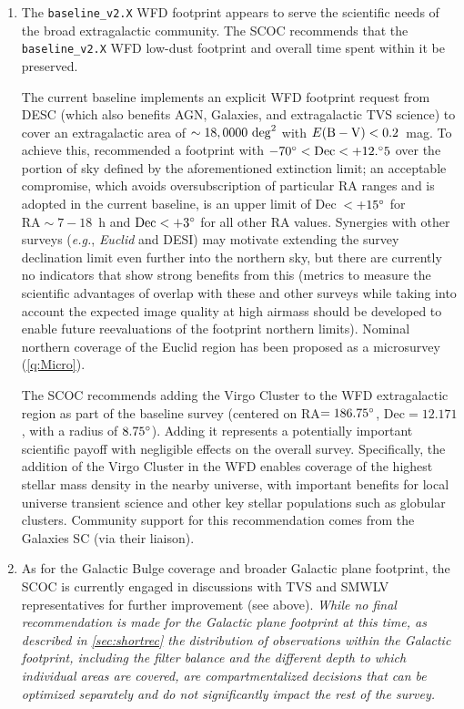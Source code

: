 \begin{enumerate}
\item 
The \texttt{baseline\_v2.X} WFD footprint appears to serve the scientific needs of the broad extragalactic community. The SCOC recommends that the \texttt{baseline\_v2.X} WFD low-dust footprint and overall time spent within it be preserved.

The current baseline implements an explicit WFD footprint request from DESC (which also benefits AGN, Galaxies, and extragalactic TVS science) to cover an extragalactic area of  $\sim18,0000~\mathrm{deg}^2$ with $E(\mathrm{B-V})<0.2$~mag. To achieve this, \cite{2022ApJS..259...58L} recommended a footprint with $-70^{\circ}<\mathrm{Dec}<+12.^{\circ}5$
 over the portion of sky defined by the aforementioned extinction limit; an acceptable compromise, which avoids oversubscription of particular RA ranges and is adopted in the current baseline, is an upper limit of Dec~$<+15^{\circ}$ for $\mathrm{RA}\sim7-18$~h and $\mathrm{Dec}<+3^{\circ}$ for all other RA values.
 Synergies with other surveys (\emph{e.g.}, \emph{Euclid} and DESI) may motivate extending the survey declination limit even further into the northern sky, but there are currently no indicators that show strong benefits from this (metrics to measure the scientific advantages of overlap with these and other surveys while taking into account the expected image quality at high airmass should be developed to enable future reevaluations of the footprint northern limits). Nominal northern coverage of the Euclid region has been proposed as a microsurvey (\autoref{q:Micro}).

The SCOC recommends adding the Virgo Cluster to the WFD extragalactic region as part of the baseline survey (centered on RA$=186.75^{\circ}$, Dec$=12.171$\degree, with a radius of $8.75^{\circ}$).
Adding it represents a potentially important scientific payoff with negligible effects on the overall survey. Specifically, the addition of the Virgo Cluster in the WFD enables coverage of the highest stellar mass density in the nearby universe, with important benefits for local universe transient science and other key stellar populations such as globular clusters. Community support for this recommendation comes from the Galaxies SC (via their liaison).

\item As for the Galactic Bulge coverage and broader Galactic plane footprint, the SCOC is currently engaged in discussions with TVS and SMWLV representatives for further improvement (see above). \emph{ While no final recommendation is made for the Galactic plane footprint at this time, as described in \autoref{sec:shortrec} the distribution of observations within the Galactic footprint, including the filter balance and the different depth to which individual areas are covered, are compartmentalized decisions that can be optimized separately and do not significantly impact the rest of the survey.}


\end{enumerate}
